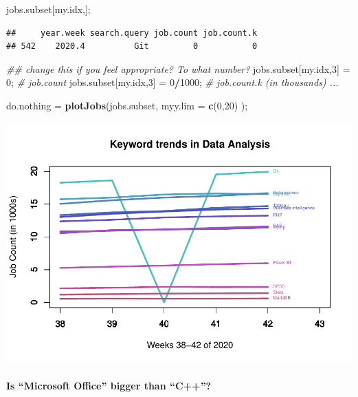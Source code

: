 \documentclass[
]{article}
\newenvironment{Shaded}{\begin{snugshade}}{\end{snugshade}}
\newcommand{\CommentTok}[1]{\textcolor[rgb]{0.56,0.35,0.01}{\textit{#1}}}
\newcommand{\DataTypeTok}[1]{\textcolor[rgb]{0.13,0.29,0.53}{#1}}
\newcommand{\DecValTok}[1]{\textcolor[rgb]{0.00,0.00,0.81}{#1}}
\newcommand{\KeywordTok}[1]{\textcolor[rgb]{0.13,0.29,0.53}{\textbf{#1}}}
\newcommand{\NormalTok}[1]{#1}
\newcommand{\OperatorTok}[1]{\textcolor[rgb]{0.81,0.36,0.00}{\textbf{#1}}}
\newcommand{\StringTok}[1]{\textcolor[rgb]{0.31,0.60,0.02}{#1}}
\begin{document}
\begin{Shaded}
\begin{Highlighting}[]
\NormalTok{jobs.subset[my.idx,];}
\end{Highlighting}
\end{Shaded}

\begin{verbatim}
##     year.week search.query job.count job.count.k
## 542    2020.4          Git         0           0
\end{verbatim}

\begin{Shaded}
\begin{Highlighting}[]
\CommentTok{\#\# change this if you feel appropriate?  To what number? }
\NormalTok{jobs.subset[my.idx,}\DecValTok{3}\NormalTok{] =}\StringTok{ }\DecValTok{0}\NormalTok{;         }\CommentTok{\# job.count}
\NormalTok{jobs.subset[my.idx,}\DecValTok{3}\NormalTok{] =}\StringTok{ }\DecValTok{0}\OperatorTok{/}\DecValTok{1000}\NormalTok{;    }\CommentTok{\# job.count.k (in thousands) ...}

\NormalTok{do.nothing =}\StringTok{ }\KeywordTok{plotJobs}\NormalTok{(jobs.subset, }\DataTypeTok{myy.lim =} \KeywordTok{c}\NormalTok{(}\DecValTok{0}\NormalTok{,}\DecValTok{20}\NormalTok{) );}
\end{Highlighting}
\end{Shaded}

\includegraphics{graphics/chunk-plotting-jobs-trends-github-solution-1.pdf}

\hypertarget{is-microsoft-office-bigger-than-c}{%
\paragraph{Is ``Microsoft Office'' bigger than
``C++''?}\label{is-microsoft-office-bigger-than-c}}
\end{document}
